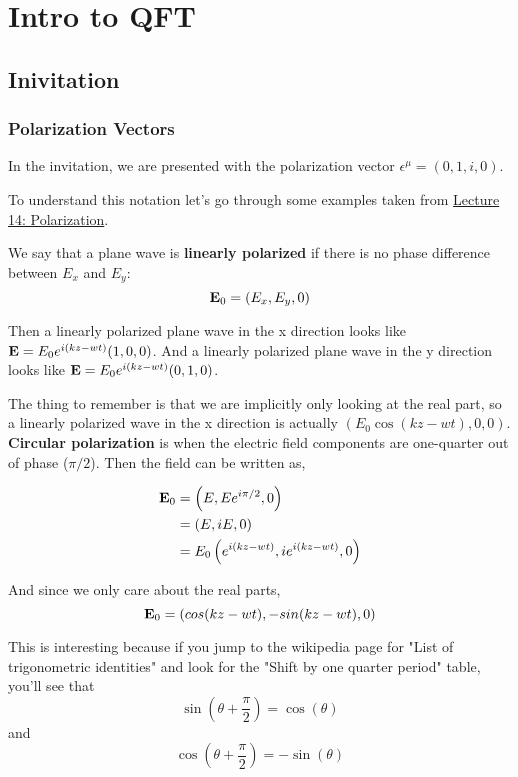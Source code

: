 \chapter{Intro to QFT}

\section{Inivitation}

\subsection{Polarization Vectors}

In the invitation, we are presented with the polarization vector $\epsilon^\mu = (0, 1, i, 0)$.

To understand this notation let's go through some examples taken from
\href{https://scholar.harvard.edu/files/schwartz/files/lecture14-polarization.pdf}{Lecture 14: Polarization}.

We say that a plane wave is \textbf{linearly polarized} if there is no phase difference between $E_x$ and $E_y$:
$$
\boldsymbol{\mathbf{E}}_0 = \left( E_x, E_y, 0 \right)
$$

Then a linearly polarized plane wave in the x direction looks like $\boldsymbol{\mathbf{E}} = E_0 e^{i(kz-wt)} (1, 0, 0)$.
And a linearly polarized plane wave in the y direction looks like $\boldsymbol{\mathbf{E}} = E_0 e^{i(kz-wt)} (0, 1, 0)$.

The thing to remember is that we are implicitly only looking at the real part, so a linearly polarized wave in the x
direction is actually $(E_0 \cos(kz-wt), 0, 0)$.
\\

\textbf{Circular polarization} is when the electric field components are one-quarter out of phase ($\pi /2$).
Then the field can be written as,

\begin{align*}
\boldsymbol{\mathbf{E}}_0 &= \left( E, E e^{i\pi/2}, 0 \right) \\
&= \left( E, iE, 0 \right) \\
&= E_0 \left( e^{i(kz-wt)}, ie^{i(kz-wt)}, 0 \right)
\end{align*}

And since we only care about the real parts,
$$
\boldsymbol{\mathbf{E}}_0 = \left( cos(kz-wt), -sin(kz-wt), 0 \right)
$$

This is interesting because if you jump to the wikipedia page for "List of trigonometric identities"
and look for the "Shift by one quarter period" table, you'll see that
$$
\sin(\theta + \frac{\pi}{2}) = \cos(\theta)
$$
and
$$
\cos(\theta + \frac{\pi}{2}) = -\sin(\theta)
$$

